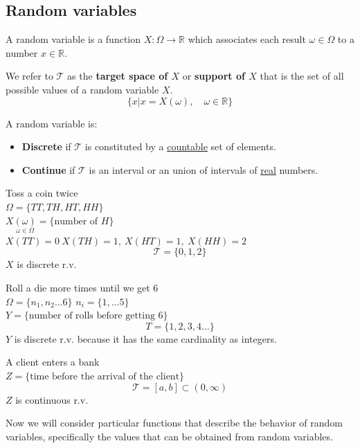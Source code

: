 \documentclass{article}
\begin{document}
\subsection{Random variables}
\begin{definition}
    A random variable is a function $X:\Omega\to \mathbb{R}$ which associates
    each result $\omega\in\Omega$ to a number $x\in \mathbb{R}$.
\end{definition}
\begin{definition}
    We refer to $\mathcal{T}$ as the \textbf{target space of $X$} or
    \textbf{support of $X$} that is the set of all possible values of a random
    variable $X$.
    $$\{x|x=X(\omega),\quad\omega\in \mathbb{R}\}$$
\end{definition}
A random variable is:
\begin{itemize}
    \item \textbf{Discrete} if $\mathcal{T}$ is constituted by a
        \underline{countable} set of elements.
    \item \textbf{Continue} if $\mathcal{T}$ is an interval or an union of
       intervals of \underline{real} numbers. 
\end{itemize}
\clearpage
\begin{example}
   Toss a coin twice\\ 
   $\Omega=\{TT,TH,HT,HH\}$\\
   $X\underset{\omega\in\Omega}{(\omega)}=\{\text{number of }H\}$\\
   $X(TT)=0\ X(TH)=1,\ X(HT)=1,\ X(HH)=2$
   $$\mathcal{T}=\{0,1,2\}$$
   $X$ is discrete r.v.
\end{example}
\begin{example}
   Roll a die more times until we get 6\\ 
   $\Omega=\{n_1,n_2\ldots6\}$ $n_i=\{1,\ldots5\}$\\ 
   $Y=\{\text{number of rolls before getting 6}\}$ 
   $$T=\{1,2,3,4\ldots\}$$
   $Y$ is discrete r.v. because it has the same cardinality as integers.
\end{example}
\begin{example}
   A client enters a bank\\ 
   $Z=\{\text{time before the arrival of the client}\}$
   $$\mathcal{T}=[a,b]\subset(0,\infty)$$
   $Z$ is continuous r.v.
\end{example}
Now we will consider particular functions that describe the behavior of random
variables, specifically the values that can be obtained from random variables.
\end{document}

